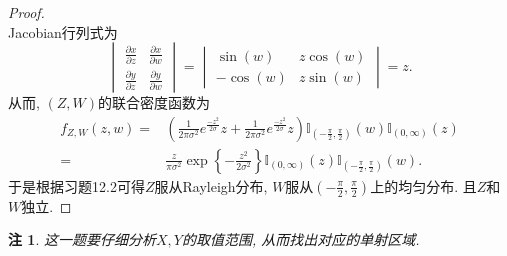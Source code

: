 \documentclass[UTF8, a4paper]{article}
\newtheorem*{remark}{注}
\begin{document}
\begin{proof}
$$$$
Jacobian行列式为
$$
\begin{vmatrix}
\frac{\partial x}{\partial z} & \frac{\partial x}{\partial w} \\
\frac{\partial y}{\partial z} & \frac{\partial y}{\partial w}
\end{vmatrix} = \begin{vmatrix}
    \sin(w) & z\cos(w) \\
    -\cos(w) & z\sin(w)
    \end{vmatrix}  = z.
$$
从而, \((Z,W)\)的联合密度函数为
$$
\begin{aligned}
    f_{Z, W}(z, w)=&\left(\frac{1}{2 \pi \sigma^2} e^{\frac{-z^2}{2 \sigma}} z+\frac{1}{2 \pi \sigma^2} e^{\frac{-z^2}{2 \sigma}} z\right) \mathbb{I}_{\left(-\frac{\pi}{2}, \frac{\pi}{2}\right)}(w) \mathbb{I}_{(0, \infty)}(z) \\
    =& \frac{z}{\pi\sigma^2} \exp\left\{-\frac{z^2}{2\sigma^2}\right\}\mathbb{I}_{(0, \infty)}(z) \mathbb{I}_{\left(-\frac{\pi}{2}, \frac{\pi}{2}\right)}(w).
\end{aligned}
$$
于是根据习题12.2可得\(Z\)服从Rayleigh分布, \(W\)服从\(\left(-\frac{\pi}{2}, \frac{\pi}{2}\right)\)上的均匀分布. 且\(Z\)和\(W\)独立.

\end{proof}

\begin{remark}
这一题要仔细分析\(X,Y\)的取值范围, 从而找出对应的{\color{blue}单射区域}.
\end{remark}
\end{document}
